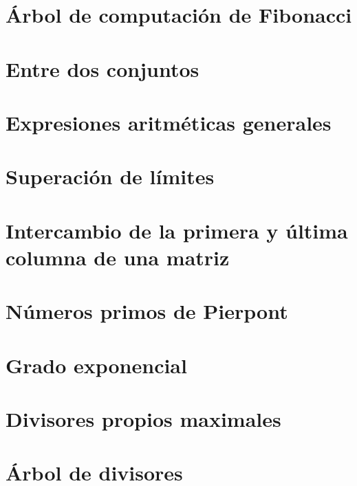 \documentclass[a4paper,12pt,twoside]{book}
\begin{document}
\chapter{Árbol de computación de Fibonacci}
\label{111218}

\chapter{Entre dos conjuntos}
\label{121218}

\chapter{Expresiones aritméticas generales}
\label{131218}

\chapter{Superación de límites}
\label{141218}


\chapter{Intercambio de la primera y última columna de
  una matriz}
\label{171218}

\chapter{Números primos de Pierpont}
\label{181218}

\chapter{Grado exponencial}
\label{191218}

\chapter{Divisores propios maximales}
\label{201218}

\chapter{Árbol de divisores}
\label{211218}
\end{document}
